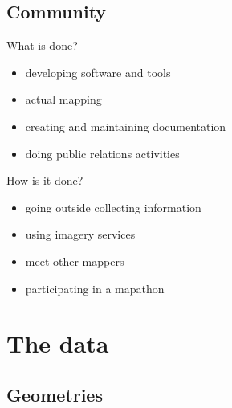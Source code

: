 \documentclass{beamer}
\begin{document}
	\subsection{Community}

	\begin{frame}{What is done?}
		\begin{itemize}
			\item developing software and tools
			\item actual mapping
			\item creating and maintaining documentation
			\item doing public relations activities
		\end{itemize}
	\end{frame}

	\begin{frame}{How is it done?}
		\begin{itemize}
		\item going outside collecting information
		\item using imagery services
		\item meet other mappers
		\item participating in a mapathon
		\end{itemize}
	\end{frame}

	\section{The data}
	
	\tableofcontents[currentsection]
	
	\subsection{Geometries}
	
\end{document}
